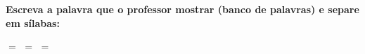 \noindent\textbf{Escreva a palavra que o professor mostrar (banco de palavras) e separe em sílabas:}

\begin{center}
  \underline{\hspace{2cm}} $=$ \underline{\hspace{2cm}} \quad \underline{\hspace{2cm}} $=$ \underline{\hspace{2cm}} \quad \underline{\hspace{2cm}} $=$ \underline{\hspace{2cm}}
  \end{center}



